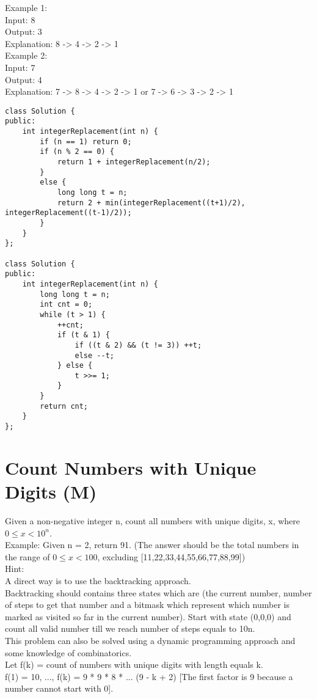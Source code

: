 Example 1:\\
Input:
8\\
Output:
3\\
Explanation:
8 -> 4 -> 2 -> 1\\

Example 2:\\
Input:
7\\
Output:
4\\
Explanation:
7 -> 8 -> 4 -> 2 -> 1
or
7 -> 6 -> 3 -> 2 -> 1\\

\begin{lstlisting}
class Solution {
public:
    int integerReplacement(int n) {
        if (n == 1) return 0;
        if (n % 2 == 0) {
            return 1 + integerReplacement(n/2);
        }
        else {
            long long t = n;
            return 2 + min(integerReplacement((t+1)/2), integerReplacement((t-1)/2));
        }
    }
};

class Solution {
public:
    int integerReplacement(int n) {
        long long t = n;
        int cnt = 0;
        while (t > 1) {
            ++cnt;
            if (t & 1) {
                if ((t & 2) && (t != 3)) ++t;
                else --t;
            } else {
                t >>= 1;
            }
        }
        return cnt;
    }
};
\end{lstlisting}


\section{Count Numbers with Unique Digits (M)}
Given a non-negative integer n, count all numbers with unique digits, x, where $0 \leq x < 10^n$.\\

Example:
Given n = 2, return 91. (The answer should be the total numbers in the range of $0 \leq x < 100$, excluding [11,22,33,44,55,66,77,88,99]) \\

Hint:\\
    A direct way is to use the backtracking approach.\\
    Backtracking should contains three states which are (the current number, number of steps to get that number and a bitmask which represent which number is marked as visited so far in the current number). Start with state (0,0,0) and count all valid number till we reach number of steps equals to 10n.\\
    This problem can also be solved using a dynamic programming approach and some knowledge of combinatorics.\\
    Let f(k) = count of numbers with unique digits with length equals k.\\
    f(1) = 10, ..., f(k) = 9 * 9 * 8 * ... (9 - k + 2) [The first factor is 9 because a number cannot start with 0].\\

